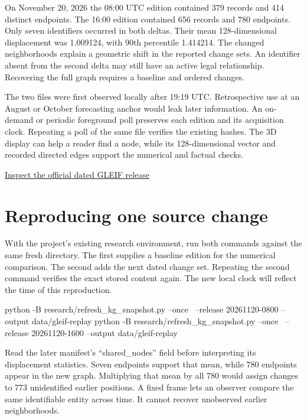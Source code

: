 \documentclass[11pt,oneside,openany]{book}
\begin{document}
On November 20, 2026 the 08:00 UTC edition contained 379 records and 414 distinct endpoints. The 16:00 edition contained 656 records and 780 endpoints. Only seven identifiers occurred in both deltas. Their mean 128-dimensional displacement was 1.009124, with 90th percentile 1.414214. The changed neighborhoods explain a geometric shift in the reported change sets. An identifier absent from the second delta may still have an active legal relationship. Recovering the full graph requires a baseline and ordered changes.

The two files were first observed locally after 19:19 UTC. Retrospective use at an August or October forecasting anchor would leak later information. An on-demand or periodic foreground poll preserves each edition and its acquisition clock. Repeating a poll of the same file verifies the existing hashes. The 3D display can help a reader find a node, while its 128-dimensional vector and recorded directed edges support the numerical and factual checks.

{\small\sffamily\href{https://goldencopy.gleif.org/api/v2/golden-copies/publishes/rr/20261120-1600}{Inspect the official dated GLEIF release}\par}
\section*{Reproducing one source change}
With the project’s existing research environment, run both commands against the same fresh directory. The first supplies a baseline edition for the numerical comparison. The second adds the next dated change set. Repeating the second command verifies the exact stored content again. The new local clock will reflect the time of this reproduction.

\begin{BookCode}
python -B research/refresh_kg_snapshot.py --once \
  --release 20261120-0800 --output data/gleif-replay
python -B research/refresh_kg_snapshot.py --once \
  --release 20261120-1600 --output data/gleif-replay
\end{BookCode}
Read the later manifest's “shared\_nodes” field before interpreting its displacement statistics. Seven endpoints support that mean, while 780 endpoints appear in the new graph. Multiplying that mean by all 780 would assign changes to 773 unidentified earlier positions. A fixed frame lets an observer compare the same identifiable entity across time. It cannot recover unobserved earlier neighborhoods.
\end{document}

